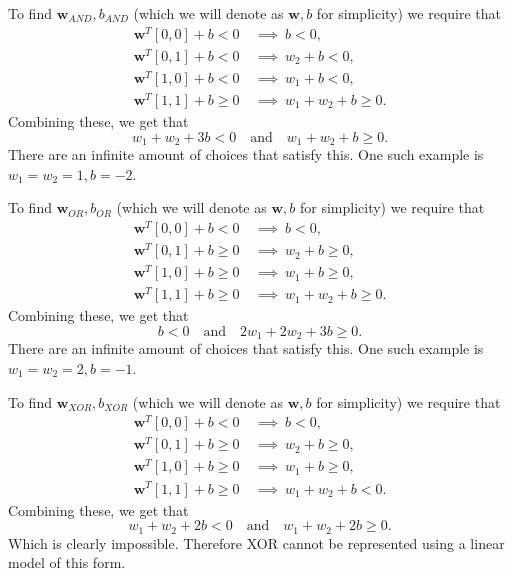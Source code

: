 \documentclass[twoside]{article}
\begin{document}
To find $\bm{w}_{AND}, b_{AND}$ (which we will denote as $\bm{w}, b$ for simplicity)
we require that
\begin{align*}
	\bm{w}^{T} [0, 0] + b < 0 \     & \implies \ b < 0,                    \\
	\bm{w}^{T} [0, 1] + b < 0 \     & \implies \ w_{2} + b < 0,            \\
	\bm{w}^{T} [1, 0] + b < 0 \     & \implies \ w_{1} + b < 0,            \\
	\bm{w}^{T} [1, 1] + b \geq 0 \  & \implies \ w_{1} + w_{2} + b \geq 0.
\end{align*}
Combining these, we get that
\begin{equation*}
	w_{1} + w_{2} + 3b < 0 \quad \text{and} \quad w_{1} + w_{2} + b \geq 0.
\end{equation*}
There are an infinite amount of choices that satisfy this.
One such example is $w_{1} = w_{2} = 1, b = -2$.

To find $\bm{w}_{OR}, b_{OR}$ (which we will denote as $\bm{w}, b$ for simplicity)
we require that
\begin{align*}
	\bm{w}^{T} [0, 0] + b < 0 \     & \implies \ b < 0,                    \\
	\bm{w}^{T} [0, 1] + b \geq 0 \  & \implies \ w_{2} + b \geq 0,         \\
	\bm{w}^{T} [1, 0] + b \geq 0 \  & \implies \ w_{1} + b \geq 0,         \\
	\bm{w}^{T} [1, 1] + b \geq 0 \  & \implies \ w_{1} + w_{2} + b \geq 0.
\end{align*}
Combining these, we get that
\begin{equation*}
	b < 0 \quad \text{and} \quad 2w_{1} + 2w_{2} + 3b \geq 0.
\end{equation*}
There are an infinite amount of choices that satisfy this.
One such example is $w_{1} = w_{2} = 2, b = -1$.

To find $\bm{w}_{XOR}, b_{XOR}$ (which we will denote as $\bm{w}, b$ for simplicity)
we require that
\begin{align*}
	\bm{w}^{T} [0, 0] + b < 0 \     & \implies \ b < 0,                 \\
	\bm{w}^{T} [0, 1] + b \geq 0 \  & \implies \ w_{2} + b \geq 0,      \\
	\bm{w}^{T} [1, 0] + b \geq 0 \  & \implies \ w_{1} + b \geq 0,      \\
	\bm{w}^{T} [1, 1] + b \geq 0 \  & \implies \ w_{1} + w_{2} + b < 0.
\end{align*}
Combining these, we get that
\begin{equation*}
	w_{1} + w_{2} + 2b < 0 \quad \text{and} \quad w_{1} + w_{2} + 2b \geq 0.
\end{equation*}
Which is clearly impossible. Therefore XOR cannot be represented using a linear model of this form.
\end{document}
